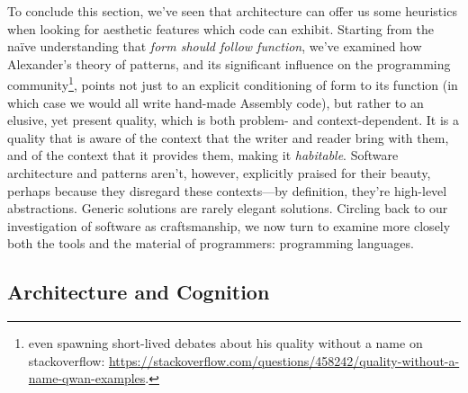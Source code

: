 To conclude this section, we've seen that architecture can offer us some heuristics when looking for aesthetic features which code can exhibit. Starting from the naïve understanding that \emph{form should follow function}, we've examined how Alexander's theory of patterns, and its significant influence on the programming community\footnote{even spawning short-lived debates about his quality without a name on stackoverflow: \url{https://stackoverflow.com/questions/458242/quality-without-a-name-qwan-examples}.}, points not just to an explicit conditioning of form to its function (in which case we would all write hand-made Assembly code), but rather to an elusive, yet present quality, which is both problem- and context-dependent. It is a quality that is aware of the context that the writer and reader bring with them, and of the context that it provides them, making it \emph{habitable}. Software architecture and patterns aren't, however, explicitly praised for their beauty, perhaps because they disregard these contexts—by definition, they're high-level abstractions. Generic solutions are rarely elegant solutions. Circling back to our investigation of software as craftsmanship, we now turn to examine more closely both the tools and the material of programmers: programming languages.

\subsection{Architecture and Cognition}
\label{subsec:architecture-cognition}


